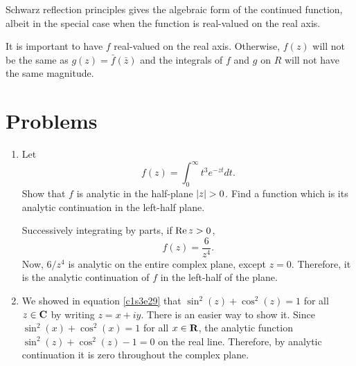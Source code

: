 \begin{rem}
Schwarz reflection principles gives the algebraic form of the continued function,
albeit in the special case when the function is real-valued on the real axis.
\end{rem}

\begin{rem}
It is important to have $f$ real-valued on the real axis. Otherwise, $f(z)$
will not be the same as $g(z) = \bar{f}(\bar{z})$ and the integrals of $f$
and $g$ on $R$ will not have the same magnitude.
\end{rem}

\section{Problems}\label{c6s5}
\begin{enumerate}
\item Let
\[
f(z) = \int_0^\infty t^3 e^{-zt}dt.
\]
Show that $f$ is analytic in the half-plane $\left\vert{z}\right\vert > 0$. Find a function which is
its analytic continuation in the left-half plane.

Successively integrating by parts, if $\operatorname{Re}{z} > 0$,
\[
f(z) = \frac{6}{z^4}.
\]
Now, $6/z^4$ is analytic on the entire complex plane, except $z = 0$. Therefore, it
is the analytic continuation of $f$ in the left-half of the plane.

\item We showed in equation \eqref{c1s3e29} that $\sin^2(z) + \cos^2(z) = 1$ for
all $z \in \mathbf{C}$ by writing $z = x + iy$. There is an easier way to show it. Since
$\sin^2(x) + \cos^2(x) = 1$ for all $x \in \mathbf{R}$, the analytic function $\sin^2(z)
+ \cos^2(z) - 1 = 0$ on the real line. Therefore, by analytic continuation it is
zero throughout the complex plane.
\end{enumerate}
